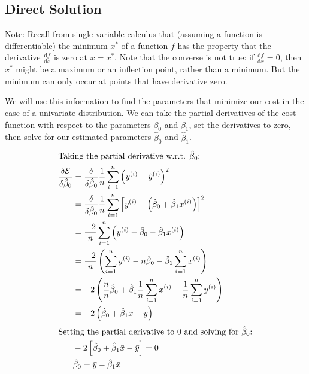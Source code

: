 \documentclass[../main.tex]{subfiles}
\begin{document}
\subsection{Direct Solution}
Note: Recall from single variable calculus that (assuming a function is differentiable) the minimum \(x^*\) of a function \(f\) has the property that the derivative \(\frac{\mathrm{d}f}{\mathrm{d}x}\) is zero at \(x = x^*\). Note that the converse is not true: if \(\frac{\mathrm{d}f}{\mathrm{d}x} = 0\), then \(x^*\) might be a maximum or an inflection point, rather than a minimum. But the minimum can only occur at points that have derivative zero.

We will use this information to find the parameters that minimize our cost in the case of a univariate distribution. We can take the partial derivatives of the cost function with respect to the parameters \(\beta_0\) and \(\beta_1\), set the derivatives to zero, then solve for our estimated parameters \(\hat\beta_0\) and \(\hat\beta_1\).
\begin{align*}
	\intertext{Taking the partial derivative w.r.t. $\hat\beta_0$:}
	\frac{\delta\mathcal{E}}{\delta{\hat\beta_0}} &= \frac{\delta}{\delta{\hat\beta_0}}\frac{1}{n}\sum_{i=1}^n \left(y^{(i)} - \hat y^{(i)}\right)^2 \\
												  &= \frac{\delta}{\delta{\hat\beta_0}}\frac{1}{n}\sum_{i=1}^n \left[y^{(i)} - \left(\hat\beta_0 + \hat\beta_1 x^{(i)}\right)\right]^2 \\
												  &= \frac{-2}{n}\sum_{i=1}^n \left(y^{(i)} - \hat\beta_0 - \hat\beta_1 x^{(i)}\right)\\
												  &= \frac{-2}{n}\left(\sum_{i=1}^ny^{(i)} - n\hat\beta_0-\hat\beta_1\sum_{i=1}^nx^{(i)}\right) \\
												  &= -2\left(\frac{n}{n}\hat\beta_0+\hat\beta_1\frac{1}{n}\sum_{i=1}^nx^{(i)}-\frac{1}{n}\sum_{i=1}^ny^{(i)}\right)\\
												  &= -2\left(\hat\beta_0+\hat\beta_1\bar x-\bar y\right)\\
	\intertext{Setting the partial derivative to 0 and solving for $\hat\beta_0$:}
												  &	-2\left[\hat\beta_0+\hat\beta_1\bar x-\bar y\right] = 0\\
												  &\hat\beta_0 = \bar{y} - \hat\beta_1\bar{x}
\end{align*}
\end{document}
